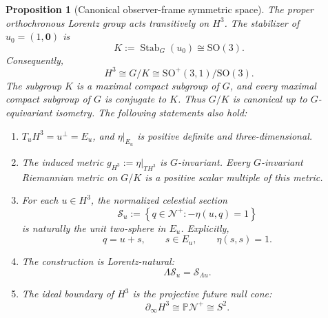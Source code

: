 \documentclass[11pt]{article}
\newtheorem{proposition}[theorem]{Proposition}
\begin{document}
\begin{proposition}[Canonical observer-frame symmetric space]
\label{prop:h3-frame-space}
The proper orthochronous Lorentz group acts transitively on \(H^3\). The
stabilizer of \(u_0=(1,\mathbf0)\) is
\[
K:=\operatorname{Stab}_G(u_0)\cong\mathrm{SO}(3).
\]
Consequently,
\[
\boxed{
H^3\cong G/K\cong \mathrm{SO}^{+}(3,1)/\mathrm{SO}(3).
}
\]
The subgroup \(K\) is a maximal compact subgroup of \(G\), and every maximal
compact subgroup of \(G\) is conjugate to \(K\). Thus \(G/K\) is canonical up
to \(G\)-equivariant isometry. The following statements also hold:
\begin{enumerate}[leftmargin=2em]
\item \(T_uH^3=u^\perp=E_u\), and \(\eta|_{E_u}\) is positive definite and
three-dimensional.
\item The induced metric \(g_{H^3}:=\eta|_{TH^3}\) is \(G\)-invariant. Every
\(G\)-invariant Riemannian metric on \(G/K\) is a positive scalar multiple of
this metric.
\item For each \(u\in H^3\), the normalized celestial section
\[
\mathcal S_u:=\left\{q\in\mathcal N^+:-\eta(u,q)=1\right\}
\]
is naturally the unit two-sphere in \(E_u\). Explicitly,
\[
q=u+s,\qquad s\in E_u,\qquad \eta(s,s)=1.
\]
\item The construction is Lorentz-natural:
\[
\Lambda\mathcal S_u=\mathcal S_{\Lambda u}.
\]
\item The ideal boundary of \(H^3\) is the projective future null cone:
\[
\boxed{
\partial_\infty H^3\cong\mathbb P\mathcal N^+\cong S^2.
}
\]
\end{enumerate}
\end{proposition}
\end{document}

